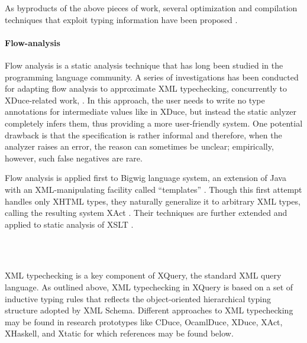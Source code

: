 \documentclass[twoside,leqno,onecolumn,pdftex]{article}
\begin{document}
\begin{scientific}
As byproducts of the above pieces of work, several optimization and
compilation techniques that exploit typing information have been
proposed \cite{Frisch04,LevinPierce05}.

\paragraph{Flow-analysis}

Flow analysis is a static analysis technique that has long been
studied in the programming language community.  A series of
investigations has been conducted for adapting flow analysis to
approximate XML typechecking, concurrently to XDuce-related work,
\cite{Bigwig,Kirkegaard06,Moeller2005}.  In this approach, the user
needs to write no type annotations for intermediate values like in
XDuce, but instead the static anlyzer completely infers them, thus
providing a more user-friendly system.  One potential drawback is that
the specification is rather informal and therefore, when the analyzer
raises an error, the reason can sometimes be unclear; empirically,
however, such false negatives are rare.

Flow analysis is applied first to Bigwig language system, an extension
of Java with an XML-manipulating facility called ``templates''
\cite{Bigwig}.  Though this first attempt handles only XHTML types,
they naturally generalize it to arbitrary XML types, calling the
resulting system XAct \cite{Kirkegaard06}.  Their techniques are
further extended and applied to static analysis of XSLT
\cite{Moeller2005}.

\end{scientific}
~\\\\
\begin{keyApp}
  XML typechecking is a key component of XQuery, the standard XML
  query language. As outlined above, XML typechecking in XQuery is
  based on a set of inductive typing rules that reflects the
  object-oriented hierarchical typing structure adopted by XML
  Schema. Different approaches to XML typechecking may be found in
  research prototypes like CDuce, OcamlDuce, XDuce,  XAct, XHaskell,
  and Xtatic for which references may be found below.
\end{keyApp}
~\\\\
\end{document}

